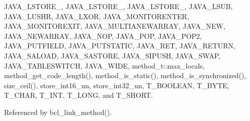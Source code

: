 JAVA\_\-LSTORE\_, JAVA\_\-LSTORE\_, JAVA\_\-LSTORE\_, JAVA\_\-LSUB, JAVA\_\-LUSHR, JAVA\_\-LXOR, JAVA\_\-MONITORENTER, JAVA\_\-MONITOREXIT, JAVA\_\-MULTIANEWARRAY, JAVA\_\-NEW, JAVA\_\-NEWARRAY, JAVA\_\-NOP, JAVA\_\-POP, JAVA\_\-POP2, JAVA\_\-PUTFIELD, JAVA\_\-PUTSTATIC, JAVA\_\-RET, JAVA\_\-RETURN, JAVA\_\-SALOAD, JAVA\_\-SASTORE, JAVA\_\-SIPUSH, JAVA\_\-SWAP, JAVA\_\-TABLESWITCH, JAVA\_\-WIDE, method\_\-t::max\_\-locals, method\_\-get\_\-code\_\-length(), method\_\-is\_\-static(), method\_\-is\_\-synchronized(), size\_\-ceil(), store\_\-int16\_\-un, store\_\-int32\_\-un, T\_\-BOOLEAN, T\_\-BYTE, T\_\-CHAR, T\_\-INT, T\_\-LONG, and T\_\-SHORT.



Referenced by bcl\_\-link\_\-method().

